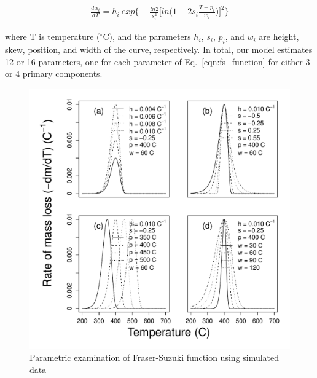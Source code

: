 \documentclass{jors}\usepackage[]{graphicx}\usepackage[]{color}
\newenvironment{knitrout}{}{} %
\begin{document}
\begin{gather}\label{eqn:fs_function}
	\frac{d\alpha_i}{dT} = h_i\ exp\bigg\{-\frac{ln2}{s_i^2}\Big[ln\Big(1 + 2s_i \frac{T - p_i}{w_i}\Big)\Big]^2\bigg\}
\end{gather}

where T is temperature ($^\circ$C), and the parameters $h_i$, $s_i$, $p_i$, and $w_i$ are height, skew, position, and width of the curve, respectively. In total, our model estimates 12 or 16 parameters, one for each parameter of Eq.~\ref{eqn:fs_function} for either 3 or 4 primary components.

\begin{knitrout}\footnotesize
{}\color{fgcolor}\begin{figure}[H]
\includegraphics[width=.9\linewidth]{figure/unnamed-chunk-6-1} \caption{\label{Fig:fs_simulation} Parametric examination of Fraser-Suzuki function using simulated data}\label{fig:unnamed-chunk-6}
\end{figure}


\end{knitrout}
\end{document}
